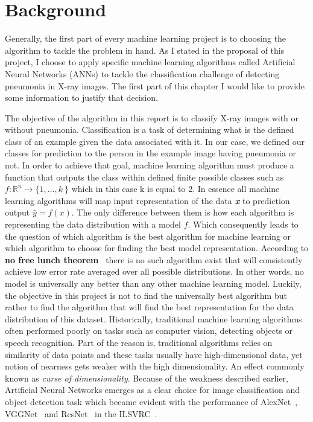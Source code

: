 \chapter{Background} \label{chap:background}
Generally, the first part of every machine learning project is to choosing the algorithm to tackle the problem in hand. As I stated in the proposal of this project, I choose to apply specific machine learning algorithms called Artificial Neural Networks (ANNs) to tackle the classification challenge of detecting pneumonia in X-ray images. The first part of this chapter I would like to provide some information to justify that decision. 

The objective of the algorithm in this report is to classify X-ray images with or without pneumonia. Classification is a task of determining what is the defined class of an example given the data associated with it. In our case, we defined our classes for prediction to the person in the example image having pneumonia or not. In order to achieve that goal, machine learning algorithm must produce a function that outputs the class within defined finite possible classes such as \(f:\mathbb{R}^n \rightarrow \{1, \ldots, k\ \}\) which in this case k is equal to 2. In essence all machine learning algorithms will map input representation of the data \textbf{\textit{x}} to prediction output $\hat{y}=f(x)$. The only difference between them is how each algorithm is representing the data distribution with a model $f$. Which consequently leads to the question of which algorithm is the best algorithm for machine learning or which algorithm to choose for finding the best model representation. According to \textbf{no free lunch theorem}~\cite{nofreelunch} there is no such algorithm exist that will consistently achieve low error rate averaged over all possible distributions. In other words, no model is universally any better than any other machine learning model. Luckily, the objective in this project is not to find the universally best algorithm but rather to find the algorithm that will find the best representation for the data distribution of this dataset. 
Historically, traditional machine learning algorithms often performed poorly on tasks such as computer vision, detecting objects or speech recognition. 
Part of the reason is, traditional algorithms relies on similarity of data points and these tasks usually have high-dimensional data, yet notion of nearness gets weaker with the high dimensionality. 
An effect commonly known as \emph{curse of dimensionality}.
Because of the weakness described earlier, Artificial Neural Networks emerges as a clear choice for image classification and object detection task which became evident with the performance of AlexNet~\cite{Alexnet}, VGGNet~\cite{vggnet} and ResNet~\cite{resnet} in the ILSVRC~\cite{imagenet}.  


